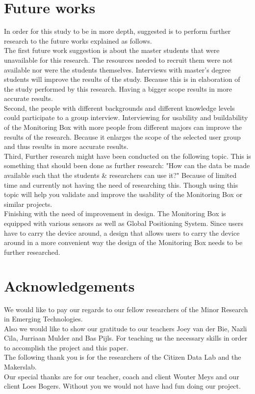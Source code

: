 \documentclass[conference]{IEEEtran}
\begin{document}
\section{Future works}
	In order for this study to be in more depth, suggested is to perform further research to the future works explained as follows. \\
	The first future work suggestion is about the master students that were unavailable for this research. The resources needed to recruit them were not available nor were the students themselves. Interviews with master's degree students will improve the results of the study. Because this is in elaboration of the study performed by this research. Having a bigger scope results in more accurate results.\\
	Second, the people with different backgrounds and different knowledge levels could participate to a group interview. Interviewing for usability and buildability of the Monitoring Box with more people from different majors can improve the results of the research. Because it enlarges the scope of the selected user group and thus results in more accurate results.\\
	Third, Further research might have been conducted on  the following topic. This is something that should been done as further research: "How can the data be made available such that the students \& researchers can use it?" Because of limited time and currently not having the need of researching this. Though using this topic will help you validate and improve the usability of the Monitoring Box or similar projects.\\
	Finishing with the need of improvement in design. The  Monitoring Box is equipped with various sensors as well as Global Positioning System. Since users have to carry the device around, a design that allows users to carry the device around in a more convenient way the design  of the Monitoring Box needs to be further researched.\\
	
\section{Acknowledgements}
We would like to pay our regards to our fellow researchers of the Minor Research in Emerging Technologies. \\
Also we would like to show our gratitude to our teachers Joey van der Bie, Nazli Cila, Jurriaan Mulder and Bas Pijls. For teaching us the necessary skills in order to accomplish the project and this paper. \\
 The following thank you is for the researchers of the Citizen Data Lab and the Makerslab. \\ 
Our special thanks are for our teacher, coach and client Wouter Meys and our client Loes Bogers. Without you we would not have had fun doing our project. 



\end{document}
